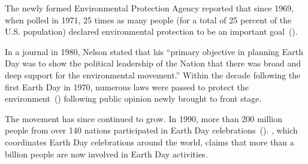 \documentclass[12pt,letterpaper]{article}
\renewcommand{\citep}[1]{(\cite{#1})}
\begin{document}
The newly formed Environmental Protection Agency reported that since 1969, when
polled in 1971, 25 times as many people (for a total of 25 percent of the U.S.
population) declared environmental protection to be an important
goal~\citep{history2009}.

In a journal in 1980, Nelson stated that his ``primary objective in planning
Earth Day was to show the political leadership of the Nation that there was
broad and deep support for the environmental movement.'' Within the decade
following the first Earth Day in 1970, numerous laws were passed to protect the
environment~\citep{nelson1980} following public opinion newly brought to front
stage.

The movement has since continued to grow. In 1990, more than 200 million people
from over 140 nations participated in Earth Day
celebrations~\citep{history2009}.  \cite{edn2015}, which coordinates Earth Day
celebrations around the world, claims that more than a billion people are now
involved in Earth Day activities.



\end{document}
